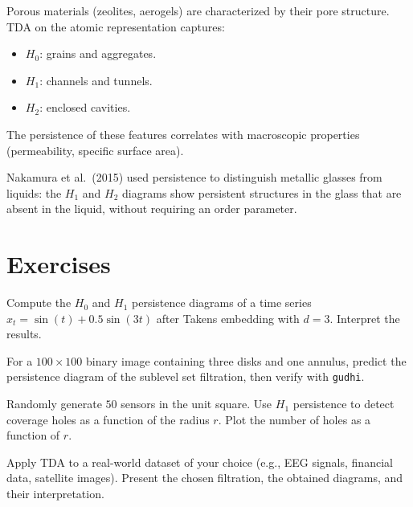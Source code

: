 \begin{example}
Porous materials (zeolites, aerogels) are characterized by their
pore structure. TDA on the atomic representation captures:
\begin{itemize}
  \item $H_0$: grains and aggregates.
  \item $H_1$: channels and tunnels.
  \item $H_2$: enclosed cavities.
\end{itemize}
The persistence of these features correlates with macroscopic
properties (permeability, specific surface area).
\end{example}

\begin{example}
Nakamura et al.\ (2015) used persistence to distinguish metallic
glasses from liquids: the $H_1$ and $H_2$ diagrams show persistent
structures in the glass that are absent in the liquid, without
requiring an order parameter.
\end{example}

\section{Exercises}

\begin{exercise}
Compute the $H_0$ and $H_1$ persistence diagrams of a time series
$x_t = \sin(t) + 0.5 \sin(3t)$ after Takens embedding with $d = 3$.
Interpret the results.
\end{exercise}

\begin{exercise}
For a $100 \times 100$ binary image containing three disks and one
annulus, predict the persistence diagram of the sublevel set
filtration, then verify with \texttt{gudhi}.
\end{exercise}

\begin{exercise}
Randomly generate $50$ sensors in the unit square. Use $H_1$
persistence to detect coverage holes as a function of the
radius $r$. Plot the number of holes as a function of $r$.
\end{exercise}

\begin{exercise}[Project]
Apply TDA to a real-world dataset of your choice (e.g., EEG signals,
financial data, satellite images). Present the chosen filtration,
the obtained diagrams, and their interpretation.
\end{exercise}
